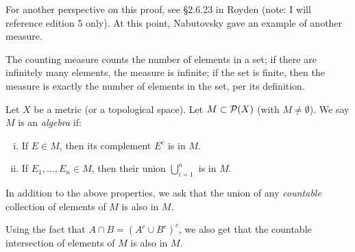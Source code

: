 For another perspective on this proof, see \S2.6.23 in Royden {\color{crimson}(note: I will reference edition 5 only)}. At this point, Nabutovsky gave an example of another measure.
\begin{definition} \label{def:counting_measure}
    The counting measure counts the number of elements in a set; if there are infinitely many elements, the measure is infinite; if the set is finite, then the measure is exactly the number of elements in the set, per its definition.
\end{definition}
\begin{definition}[Algebra] \label{def:algebra}
    Let $X$ be a metric (or a topological space). Let $M \subset \mathcal P(X)$ (with $M \neq \emptyset$). We say $M$ is an \textit{algebra} if:
    \begin{enumerate}[(i)]
        \item If $E \in M$, then its complement $E^c$ is in $M$.
        \item If $E_1, \dots, E_n \in M$, then their union $\bigcup_{i=1}^n$ is in $M$.
    \end{enumerate}
\end{definition}
\begin{definition} \label{def:sigma_algebra}
    In addition to the above properties, we ask that the union of any \textit{countable} collection of elements of $M$ is also in $M$.
\end{definition}
Using the fact that $A \cap B = (A^c \cup B^c)^c$, we also get that the countable intersection of elements of $M$ is also in $M$.